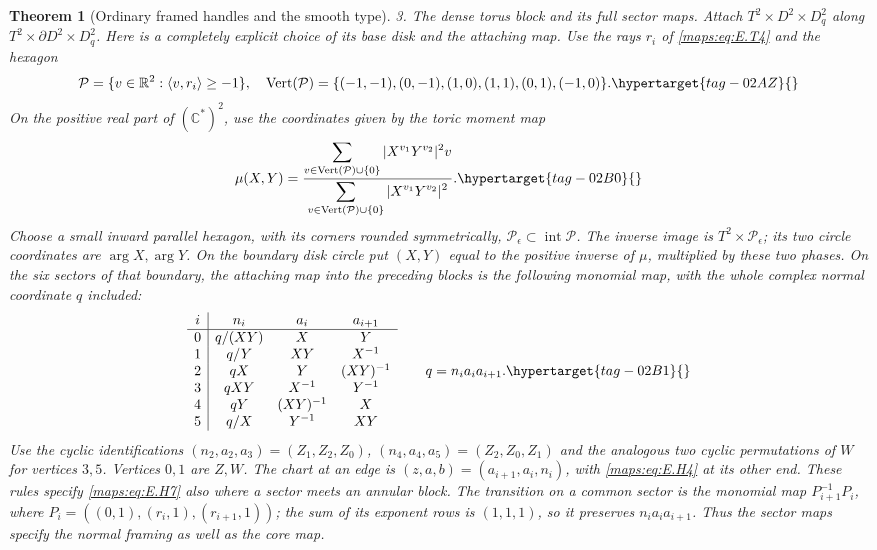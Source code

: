 \documentclass[11pt,a4paper]{article}
\numberwithin{equation}{section}
\newtheorem{theorem}{Theorem}[section]
\theoremstyle{definition}
\begin{document}
\begin{theorem}[Ordinary framed handles and the smooth type]
\emph{3. The dense torus block and its full sector maps.}
Attach $T^2\times D^2\times D^2_q$ along
$T^2\times\partial D^2\times D^2_q$.  Here is a completely explicit
choice of its base disk and the attaching map.  Use the rays
$r_i$ of \eqref{maps:eq:E.T4} and the hexagon
\begin{equation}
 \mathcal P=\{v\in\mathbb R^2:\langle v,r_i\rangle\geq-1\},
 \quad
 \operatorname{Vert}(\mathcal P)=
 \{(-1,-1),(0,-1),(1,0),(1,1),(0,1),(-1,0)\}.
 \hypertarget{tag-02AZ}{}\label{maps:eq:E.H5}
\end{equation}
On the positive real part of $(\mathbb C^*)^2$, use the coordinates
given by the toric moment map
\begin{equation}
 \mu(X,Y)=
 \frac{\displaystyle\sum_{v\in\operatorname{Vert}(\mathcal P)\cup\{0\}}
                 |X^{v_1}Y^{v_2}|^2v}
      {\displaystyle\sum_{v\in\operatorname{Vert}(\mathcal P)\cup\{0\}}
                 |X^{v_1}Y^{v_2}|^2}.
 \hypertarget{tag-02B0}{}\label{maps:eq:E.H6}
\end{equation}
Choose a small inward parallel hexagon, with its corners rounded
symmetrically, $\mathcal P_\epsilon\subset\operatorname{int}\mathcal P$.
The inverse image is $T^2\times\mathcal P_\epsilon$; its two circle
coordinates are $\arg X,\arg Y$.  On the boundary disk circle put
$(X,Y)$ equal to the positive inverse of $\mu$, multiplied by these
two phases.  On the six sectors of that boundary, the attaching
map into the preceding blocks is the following monomial map, with
the whole complex normal coordinate $q$ included:
\begin{equation}
\begin{array}{c|ccc}
 i& n_i&a_i&a_{i+1}\\ \hline
0&q/(XY)&X&Y\\
1&q/Y&XY&X^{-1}\\
2&qX&Y&(XY)^{-1}\\
3&qXY&X^{-1}&Y^{-1}\\
4&qY&(XY)^{-1}&X\\
5&q/X&Y^{-1}&XY
\end{array}
\qquad q=n_i a_i a_{i+1}.
\hypertarget{tag-02B1}{}\label{maps:eq:E.H7}
\end{equation}
Use the cyclic identifications
$(n_2,a_2,a_3)=(Z_1,Z_2,Z_0)$,
$(n_4,a_4,a_5)=(Z_2,Z_0,Z_1)$ and the analogous two cyclic
permutations of $W$ for vertices $3,5$.  Vertices $0,1$ are $Z,W$.
The chart at an edge is $(z,a,b)=(a_{i+1},a_i,n_i)$, with \eqref{maps:eq:E.H4}
at its other end.  These rules specify \eqref{maps:eq:E.H7} also where a sector
meets an annular block.  The transition on a common sector is the
monomial map $P_{i+1}^{-1}P_i$, where
$P_i=((0,1),(r_i,1),(r_{i+1},1))$; the sum of its exponent rows
is $(1,1,1)$, so it preserves $n_i a_i a_{i+1}$.  Thus the sector maps specify the
normal framing as well as the core map.  


\end{theorem}
\end{document}
